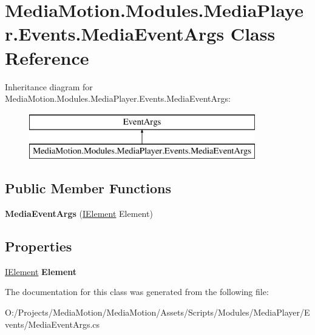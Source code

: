 \hypertarget{class_media_motion_1_1_modules_1_1_media_player_1_1_events_1_1_media_event_args}{\section{Media\+Motion.\+Modules.\+Media\+Player.\+Events.\+Media\+Event\+Args Class Reference}
\label{class_media_motion_1_1_modules_1_1_media_player_1_1_events_1_1_media_event_args}
}
Inheritance diagram for Media\+Motion.\+Modules.\+Media\+Player.\+Events.\+Media\+Event\+Args\+:\begin{figure}[H]
\begin{center}
\leavevmode
\includegraphics[height=2.000000cm]{class_media_motion_1_1_modules_1_1_media_player_1_1_events_1_1_media_event_args}
\end{center}
\end{figure}
\subsection*{Public Member Functions}
\begin{DoxyCompactItemize}
\item 
\hypertarget{class_media_motion_1_1_modules_1_1_media_player_1_1_events_1_1_media_event_args_a4052483bf9145836864f5f3c1ae08ecd}{{\bfseries Media\+Event\+Args} (\hyperlink{interface_media_motion_1_1_core_1_1_models_1_1_interfaces_1_1_i_element}{I\+Element} Element)}\label{class_media_motion_1_1_modules_1_1_media_player_1_1_events_1_1_media_event_args_a4052483bf9145836864f5f3c1ae08ecd}

\end{DoxyCompactItemize}
\subsection*{Properties}
\begin{DoxyCompactItemize}
\item 
\hypertarget{class_media_motion_1_1_modules_1_1_media_player_1_1_events_1_1_media_event_args_ac18a4b5750d0414eba87893d867649e2}{\hyperlink{interface_media_motion_1_1_core_1_1_models_1_1_interfaces_1_1_i_element}{I\+Element} {\bfseries Element}}\label{class_media_motion_1_1_modules_1_1_media_player_1_1_events_1_1_media_event_args_ac18a4b5750d0414eba87893d867649e2}

\end{DoxyCompactItemize}


The documentation for this class was generated from the following file\+:\begin{DoxyCompactItemize}
\item 
O\+:/\+Projects/\+Media\+Motion/\+Media\+Motion/\+Assets/\+Scripts/\+Modules/\+Media\+Player/\+Events/Media\+Event\+Args.\+cs\end{DoxyCompactItemize}
